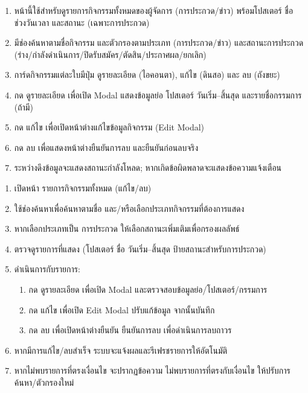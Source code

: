 \begin{sloppypar}
	\begin{enumerate}
		\item หน้านี้ใช้สำหรับดูรายการกิจกรรมทั้งหมดของผู้จัดการ (การประกวด/ข่าว) พร้อมโปสเตอร์ ชื่อ ช่วงวันเวลา และสถานะ (เฉพาะการประกวด)
		\item มีช่องค้นหาตามชื่อกิจกรรม และตัวกรองตามประเภท (การประกวด/ข่าว) และสถานะการประกวด (ร่าง/กำลังดำเนินการ/ปิดรับสมัคร/ตัดสิน/ประกาศผล/ยกเลิก)
		\item การ์ดกิจกรรมแต่ละใบมีปุ่ม ดูรายละเอียด (ไอคอนตา), แก้ไข (ดินสอ) และ ลบ (ถังขยะ)
		\item กด ดูรายละเอียด เพื่อเปิด Modal แสดงข้อมูลย่อ โปสเตอร์ วันเริ่ม–สิ้นสุด และรายชื่อกรรมการ (ถ้ามี)
		\item กด แก้ไข เพื่อเปิดหน้าต่างแก้ไขข้อมูลกิจกรรม (Edit Modal)
		\item กด ลบ เพื่อแสดงหน้าต่างยืนยันการลบ และยืนยันก่อนลบจริง
		\item ระหว่างดึงข้อมูลจะแสดงสถานะกำลังโหลด; หากเกิดข้อผิดพลาดจะแสดงข้อความแจ้งเตือน
	\end{enumerate}
\end{sloppypar}

\par

\begin{sloppypar}
	\begin{enumerate}
		\item เปิดหน้า รายการกิจกรรมทั้งหมด (แก้ไข/ลบ)
		\item ใช้ช่องค้นหาเพื่อค้นหาตามชื่อ และ/หรือเลือกประเภทกิจกรรมที่ต้องการแสดง
		\item หากเลือกประเภทเป็น การประกวด ให้เลือกสถานะเพิ่มเติมเพื่อกรองผลลัพธ์
		\item ตรวจดูรายการที่แสดง (โปสเตอร์ ชื่อ วันเริ่ม–สิ้นสุด ป้ายสถานะสำหรับการประกวด)
		\item ดำเนินการกับรายการ:
		\begin{enumerate}
			\item กด ดูรายละเอียด เพื่อเปิด Modal และตรวจสอบข้อมูลย่อ/โปสเตอร์/กรรมการ
			\item กด แก้ไข เพื่อเปิด Edit Modal ปรับแก้ข้อมูล จากนั้นบันทึก
			\item กด ลบ เพื่อเปิดหน้าต่างยืนยัน ยืนยันการลบ เพื่อดำเนินการลบถาวร
		\end{enumerate}
		\item หากมีการแก้ไข/ลบสำเร็จ ระบบจะแจ้งผลและรีเฟรชรายการให้อัตโนมัติ
		\item หากไม่พบรายการที่ตรงเงื่อนไข จะปรากฏข้อความ ไม่พบรายการที่ตรงกับเงื่อนไข ให้ปรับการค้นหา/ตัวกรองใหม่
	\end{enumerate}
\end{sloppypar}


